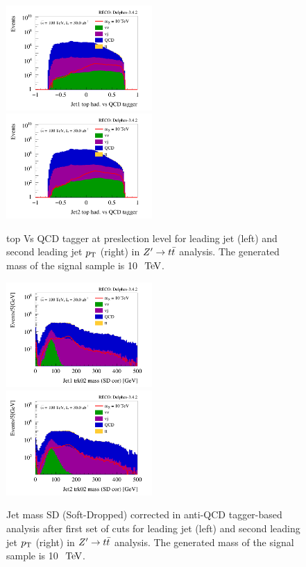 \documentclass{cernrep}
\begin{document}
\begin{figure}[!htb]\centering
\includegraphics[width=0.495\textwidth]{Fig/Zptt/tagger/Jet1_thad_vs_QCD_tagger_sel0_nostack_log.png}
\includegraphics[width=0.495\textwidth]{Fig/Zptt/tagger/Jet2_thad_vs_QCD_tagger_sel0_nostack_log.png}
\caption{top Vs QCD tagger at preslection level for leading jet (left) and second leading jet $p\sb{\scriptstyle\mathrm{T}}$ (right) in $Z^{\prime} \rightarrow t\bar{t}$ analysis. The generated mass of the signal sample is 10 $\TeV$.}
\label{fig:Zptt_sel0_tagger}
\end{figure}

\begin{figure}[!htb]\centering
\includegraphics[width=0.495\textwidth]{Fig/Zptt/tagger/Jet1_trk02_SD_Cor_m_sel1_nostack_log.png}
\includegraphics[width=0.495\textwidth]{Fig/Zptt/tagger/Jet2_trk02_SD_Cor_m_sel1_nostack_log.png}
\caption{Jet mass SD (Soft-Dropped) corrected in anti-QCD tagger-based analysis after first set of cuts for leading jet (left) and second leading jet $p\sb{\scriptstyle\mathrm{T}}$ (right) in $Z^{\prime} \rightarrow t\bar{t}$ analysis. The generated mass of the signal sample is 10 $\TeV$.}
\label{fig:RSGww_sel1_tagger}
\end{figure}
\end{document}
